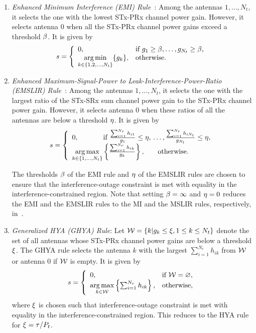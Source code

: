 \documentclass[journal]{IEEEtran}
\DeclareMathOperator*{\argmin}{arg\,min}
\DeclareMathOperator*{\argmax}{arg\,max}
\newcommand{\nx}{{0}}
\newcommand{\frhg}[1]{{\frac{\sumnr \hk{i#1}}{\gk{#1}}}}
\newcommand{\Nt}{{N_t}}
\newcommand{\Nr}{{N_r}}
\newcommand{\Pt}{{P_t}}
\newcommand{\such}{h}
\newcommand{\puch}{g}
\newcommand{\hk}[1]{{\such_{#1}}}
\newcommand{\gk}[1]{{\puch_{#1}}}
\newcommand{\antopts}{\left\{1,2,\ldots,\Nt\right\}}
\newcommand{\nullset}{\varnothing}
\newcommand{\sumnr}{\sum_{i=1}^{\Nr}}
\begin{document}
\begin{enumerate}
\item {\em Enhanced Minimum Interference (EMI) Rule~\cite{Sarvendranath_2013_TCOM}}: Among the antennas $1,\ldots,\Nt$, it selects the one with the lowest STx-PRx channel power gain. However, it selects antenna $\nx$ when all the STx-PRx channel power gains exceed a threshold $\beta$. It is given by
\begin{equation}
\label{eq:MI_rule}
s = \left\{
\begin{array}{ll}
\nx, & \text{if}~ \gk{1}\geq\emiconst,\ldots,\gk{\Nt}\geq\emiconst,\\
\argmin\limits_{k\in\antopts}\{\gk{k}\}, &\text{otherwise}.  
\end{array}\right.
\end{equation} 


\item {\em Enhanced Maximum-Signal-Power to Leak-Interference-Power-Ratio (EMSLIR) Rule~\cite{Sarvendranath_2014_TCOM}}: Among the antennas $1,\ldots,\Nt$, it selects the one with the largest ratio of the STx-SRx sum channel power gain to the STx-PRx channel power gain. However, it selects antenna $0$ when these ratios of all the antennas are below a threshold $\eta$.  It is given by
\begin{equation}
\label{eq:MSLIR_rule}
s = \left\{
\begin{array}{ll}
\nx,  \hspace{35pt}\text{if}~\frhg{1}\leq\emslirconst,&\!\!\!\!\ldots,\frhg{\Nt}\leq\emslirconst,\\
\argmax\limits_{k\in\{1,\ldots,\Nt\}}\left\lbrace \frhg{k}\right\rbrace, &\text{otherwise}.
\end{array}\right.
\end{equation} 


The thresholds $\beta$ of the EMI rule and $\eta$ of the EMSLIR rules are chosen to ensure that the interference-outage constraint is met with equality in the interference-constrained region. Note that setting $\beta=\infty$ and $\eta=0$ reduces the EMI and the EMSLIR rules to the MI and the MSLIR rules, respectively, in~\cite{Zhou_2008_IET}.

\item {\em Generalized HYA (GHYA) Rule}: Let $\enset = \{ k|\gk{k}\leq\epicconst,1\leq k\leq\Nt\}$ denote the set of all antennas whose STx-PRx channel power gains are below a threshold $\xi$. The GHYA rule selects the antenna $k$ with the largest $\sumnr\hk{ik}$ from ${\cal{W}}$ or antenna $0$ if ${\cal{W}}$ is empty. It is given by
\begin{equation}
\label{eq:GHYA_rule}
s = \left\{
\begin{array}{ll}
\nx, & \text{if}~\enset=\nullset,\\
\argmax\limits_{k\in \enset }\left\lbrace \sumnr\hk{ik} \right\rbrace, &\text{otherwise},  
\end{array}\right.
\end{equation} 
where $\xi$ is chosen such that interference-outage constraint is met with equality in the interference-constrained region. This reduces to the HYA rule for $\epicconst=\tau/\Pt$.


\end{enumerate}
\end{document}
